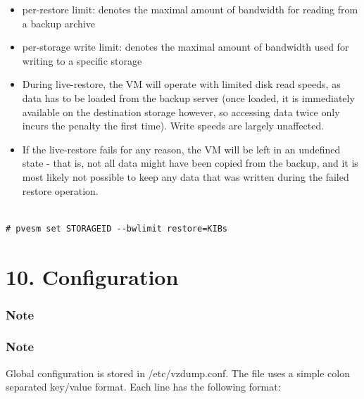 \begin{itemize}[leftmargin=2cm]

	\item per-restore limit: denotes the maximal amount of bandwidth for reading from a backup archive

	\item per-storage write limit: denotes the maximal amount of bandwidth used for writing to a specific storage

\end{itemize}

\begin{itemize}[leftmargin=2cm]

	\item During live-restore, the VM will operate with limited disk read speeds, as data has to be loaded from the backup server (once loaded, it is immediately available on the destination storage however, so accessing data twice only incurs the penalty the first time). Write speeds are largely unaffected.

	\item If the live-restore fails for any reason, the VM will be left in an undefined state - that is, not all data might have been copied from the backup, and it is most likely not possible to keep any data that was written during the failed restore operation.

\end{itemize}

\begin{lstlisting}

# pvesm set STORAGEID --bwlimit restore=KIBs

\end{lstlisting}


\section{10. Configuration}

\subsubsection{Note}

\subsubsection{Note}

Global configuration is stored in /etc/vzdump.conf. The file uses a simple colon separated key/value format. Each line has the following format:

